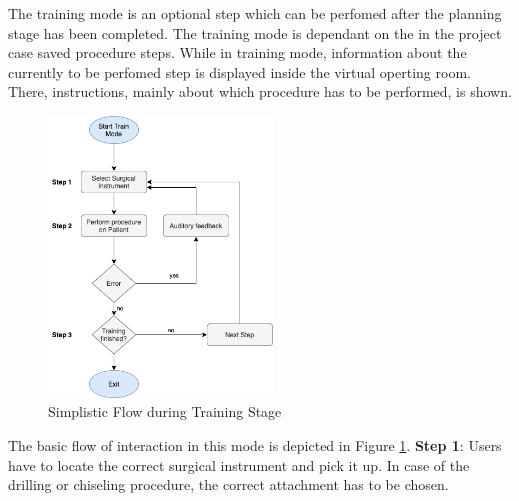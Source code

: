 The training mode is an optional step which can be perfomed after the planning stage has been completed.
The training mode is dependant on the in the project case saved procedure steps.
While in training mode, information about the currently to be perfomed step is displayed inside the virtual operting room.
There, instructions, mainly about which procedure has to be performed, is shown.

\begin{figure}[ht!]
    \centering
    \includegraphics[width=225px]{images/implementation/features/training/training_flow.png}
    \caption{\label{fig::TrainingFlow}Simplistic Flow during Training Stage}
\end{figure}

The basic flow of interaction in this mode is depicted in Figure \ref{fig::TrainingFlow}.
\newline
\textbf{Step 1}: Users have to locate the correct surgical instrument and pick it up.
In case of the drilling or chiseling procedure, the correct attachment has to be chosen.

